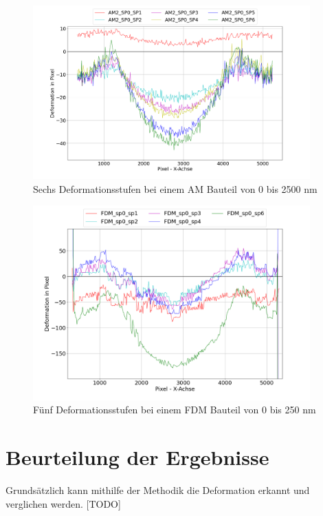 \begin{figure}[H]
  \centering
  \includegraphics[width=0.95\textwidth]{images/am2_all_defos.png}
  \caption{Sechs Deformationsstufen bei einem AM Bauteil von 0 bis 2500 nm}
  \label{fig:am_defos}
\end{figure}

\begin{figure}[H]
  \centering
  \includegraphics[width=0.95\textwidth]{images/fdm2_all_defos.png}
  \caption{Fünf Deformationsstufen bei einem FDM Bauteil von 0 bis 250 nm}
  \label{fig:fdm_defos}
\end{figure}

\section{Beurteilung der Ergebnisse}

Grundsätzlich kann mithilfe der Methodik die Deformation erkannt und verglichen 
werden. [TODO]
